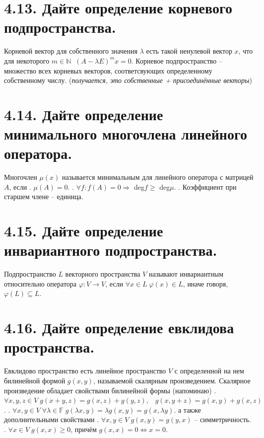 \documentclass{article}
\begin{document}
\section*{\LARGE 4.13. Дайте определение корневого подпространства.}
Корневой вектор для собственного значения $\lambda$ есть такой ненулевой вектор $x$, что для некоторого $m \in \mathbb{N} \;\; (A - \lambda E)^m x = 0$. 
\newline Корневое подпространство -- множество всех корневых векторов, соответсвующих определенному собственному числу. (\textit{получается, это собственные + присоединённые векторы})

\section*{\LARGE 4.14. Дайте определение минимального многочлена линейного оператора.}
Многочлен $\mu (x)$ называется минимальным для линейного оператора с матрицей $A$, если 
. $\mu (A) = 0$.
. $\forall f : f(A) = 0 \Rightarrow $ deg$f \ge$ deg$\mu$.
. Коэффициент при старшем члене -- единица.

\section*{\LARGE 4.15. Дайте определение инвариантного подпространства.}
Подпространство $L$ векторного пространства $V$ называют инвариантным относительно оператора $\varphi : V \rightarrow V$, если $\forall x \in L \; \varphi(x) \in L$, иначе говоря, $\varphi(L) \subseteq L$.

\section*{\LARGE 4.16. Дайте определение евклидова пространства.}
Евклидово пространство есть линейное пространство $V$ с определенной на нем билинейной формой $g(x, y)$, называемой скалярным произведением. Скалярное произведение обладает свойствами билинейной формы (напоминаю)
\newline {}. $\forall x, y, z \in V \; g(x + y, z) = g(x, z) + g(y, z),\;\;\; g(x, y + z) = g(x, y) + g(x, z) $.
\newline {}. $\forall x, y \in V \; \forall \lambda \in \mathbb{F} \; g(\lambda x, y) = \lambda g(x, y) =  g(x, \lambda y) $.
\newline а также дополнительными свойствами
\newline {}. $\forall x, y \in V \; g(x, y) = g(y, x)$ -- симметричность.
\newline {}. $\forall x \in V \; g(x, x) \ge 0$, причём $g(x,x) = 0 \Leftrightarrow x = 0$.
\end{document}
